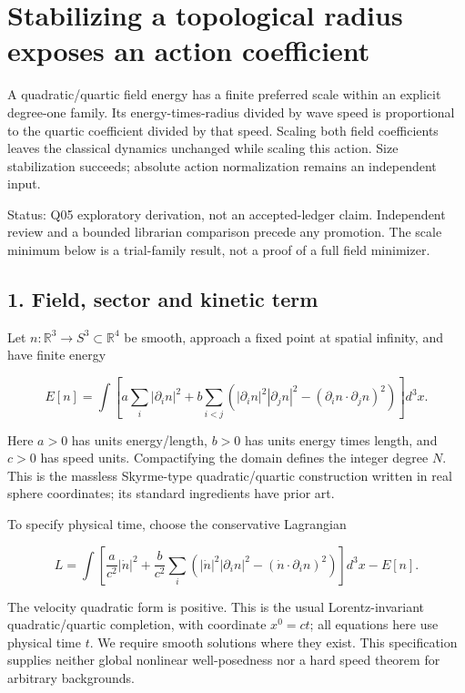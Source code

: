 \documentclass[11pt,a4paper]{article}
\begin{document}
\hypertarget{stabilizing-a-topological-radius-exposes-an-action-coefficient}{%
\section{Stabilizing a topological radius exposes an action
coefficient}\label{stabilizing-a-topological-radius-exposes-an-action-coefficient}}

A quadratic/quartic field energy has a finite preferred scale within an
explicit degree-one family. Its energy-times-radius divided by wave
speed is proportional to the quartic coefficient divided by that speed.
Scaling both field coefficients leaves the classical dynamics unchanged
while scaling this action. Size stabilization succeeds; absolute action
normalization remains an independent input.

Status: Q05 exploratory derivation, not an accepted-ledger claim.
Independent review and a bounded librarian comparison precede any
promotion. The scale minimum below is a trial-family result, not a proof
of a full field minimizer.

\hypertarget{field-sector-and-kinetic-term}{%
\subsection{1. Field, sector and kinetic
term}\label{field-sector-and-kinetic-term}}

Let \(n:\mathbb R^3\to S^3\subset\mathbb R^4\) be smooth, approach a
fixed point at spatial infinity, and have finite energy

\[E[n]=\int\left[a\sum_i|\partial_i n|^2+
b\sum_{i<j}\left(|\partial_i n|^2|\partial_j n|^2
-(\partial_i n\cdot\partial_j n)^2\right)\right]d^3x. \tag{1}\]

Here \(a>0\) has units energy/length, \(b>0\) has units energy times
length, and \(c>0\) has speed units. Compactifying the domain defines
the integer degree \(N\). This is the massless Skyrme-type
quadratic/quartic construction written in real sphere coordinates; its
standard ingredients have prior art.

To specify physical time, choose the conservative Lagrangian

\[L=\int\left[\frac{a}{c^2}|\dot n|^2+
\frac{b}{c^2}\sum_i\left(|\dot n|^2|\partial_i n|^2
-(\dot n\cdot\partial_i n)^2\right)\right]d^3x-E[n]. \tag{2}\]

The velocity quadratic form is positive. This is the usual
Lorentz-invariant quadratic/quartic completion, with coordinate
\(x^0=ct\); all equations here use physical time \(t\). We require
smooth solutions where they exist. This specification supplies neither
global nonlinear well-posedness nor a hard speed theorem for arbitrary
backgrounds.
\end{document}
